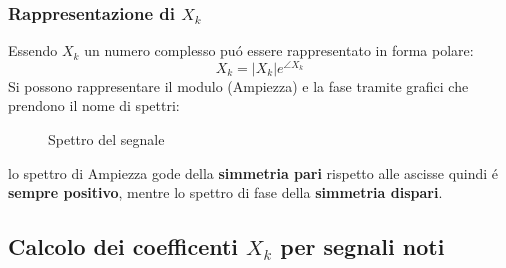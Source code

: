         \subsubsection{Rappresentazione di $X_k$}
            Essendo $X_k$ un numero complesso puó essere rappresentato in forma polare: 
            \[
                X_k = |X_k|e^{\angle X_k}  
            \]
            Si possono rappresentare il modulo (Ampiezza) e la fase tramite grafici che prendono il nome di spettri:
            \begin{figure}[H]
                \centering
                \hfill
                \caption{Spettro del segnale}
            \end{figure}
            lo spettro di Ampiezza gode della \textbf{simmetria pari} rispetto alle ascisse quindi é \textbf{sempre positivo}, mentre lo spettro di fase della \textbf{simmetria dispari}.
        \subsection{Calcolo dei coefficenti $X_k$ per segnali noti}
